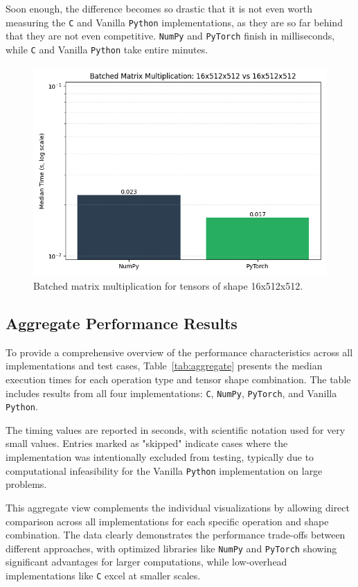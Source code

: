 \documentclass[a4paper,12pt]{article}
\begin{document}
Soon enough, the difference becomes so drastic that it is not even worth
measuring the \texttt{C} and Vanilla \texttt{Python} implementations, as they
are so far behind that they are not even competitive. \texttt{NumPy} and \texttt{PyTorch} finish in milliseconds, while \texttt{C} and Vanilla \texttt{Python} take entire minutes.

\begin{figure}[H]
  \centering
  \includegraphics[width=0.7\linewidth]{results/bar/BMM_16x512x512_16x512x512.png}
  \caption{Batched matrix multiplication for tensors of shape 16x512x512.}
  \label{fig:five}
\end{figure}

\subsection{Aggregate Performance Results}

To provide a comprehensive overview of the performance characteristics across all implementations and test cases, Table~\ref{tab:aggregate} presents the median execution times for each operation type and tensor shape combination. The table includes results from all four implementations: \texttt{C}, \texttt{NumPy}, \texttt{PyTorch}, and Vanilla \texttt{Python}.

The timing values are reported in seconds, with scientific notation used for very small values. Entries marked as "skipped" indicate cases where the implementation was intentionally excluded from testing, typically due to computational infeasibility for the Vanilla \texttt{Python} implementation on large problems.

This aggregate view complements the individual visualizations by allowing direct comparison across all implementations for each specific operation and shape combination. The data clearly demonstrates the performance trade-offs between different approaches, with optimized libraries like \texttt{NumPy} and \texttt{PyTorch} showing significant advantages for larger computations, while low-overhead implementations like \texttt{C} excel at smaller scales.
\end{document}
